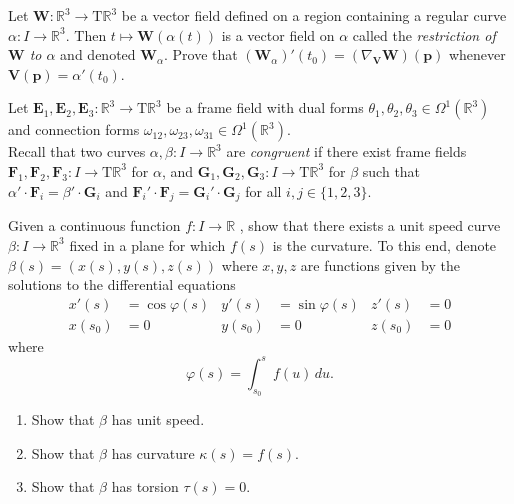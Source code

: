 \documentclass[12 pt, letterpaper]{hmcpset}
\begin{document}
\begin{problem}[Problem 1.]
	Let $\mathbf{W} : \mathbb{R}^{3} \to \mathrm{T}\mathbb{R}^{3}$ be a vector field defined on a region containing a regular curve $\alpha : I \to \mathbb{R}^{3}$. Then $t \mapsto \mathbf{W}(\alpha(t))$ is a vector field on $\alpha$ called the \textit{restriction of $\mathbf{W}$ to $\alpha$} and denoted $\mathbf{W}_{\alpha}$. Prove that $(\mathbf{W}_{\alpha})'(t_{0}) = (\nabla_{\mathbf{V}} \mathbf{W})(\mathbf{p})$ whenever $\mathbf{V}(\mathbf{p}) = \alpha'(t_{0})$.
\end{problem}

\pagebreak

\begin{problem}[Problem 2.]
	Let $\mathbf{E}_{1}, \mathbf{E}_{2}, \mathbf{E}_{3} : \mathbb{R}^{3} \to \mathrm{T} \mathbb{R}^{3}$ be a frame field with dual forms $\theta_{1}, \theta_2, \theta_{3} \in \Omega^{1}(\mathbb{R}^{3})$ and connection forms $\omega_{12}, \omega_{23}, \omega_{31} \in \Omega^{1}(\mathbb{R}^{3})$. \\

	Recall that two curves $\alpha, \beta : I \to \mathbb{R}^{3}$ are \textit{congruent} if there exist frame fields $\mathbf{F}_{1}, \mathbf{F}_{2}, \mathbf{F}_{3} : I \to \mathrm{T}\mathbb{R}^{3}$ for $\alpha$, and $\mathbf{G}_{1}, \mathbf{G}_{2}, \mathbf{G}_3 : I \to \mathrm{T} \mathbb{R}^{3}$ for $\beta$ such that $\alpha' \cdot \mathbf{F}_{i} = \beta' \cdot \mathbf{G}_{i}$ and $\mathbf{F}_{i}' \cdot \mathbf{F}_{j} = \mathbf{G}_{i}' \cdot \mathbf{G}_{j}$ for all $i, j \in \{ 1, 2, 3 \}$.
\end{problem}

\pagebreak

\begin{problem}[Problem 3.]
	Given a continuous function $f : I \to \mathbb{R}$ , show that there exists a unit speed curve $\beta : I \to \mathbb{R}^{3}$  fixed in a plane for which $f(s)$  is the curvature. To this end, denote $\beta(s) = (x(s), y(s), z(s))$  where $x, y, z$  are functions given by the solutions to the differential equations
	\begin{align*}
		x'(s) & = \cos{\varphi(s)} & y'(s) & = \sin{\varphi(s)} & z'(s) & = 0 \\
		x(s_{0}) & = 0 & y(s_{0}) & = 0 & z(s_{0}) & = 0
	\end{align*}
	where
	\[
		\varphi(s) = \int_{s_{0}}^{s} f(u) \, du.
	\]
	\begin{enumerate}
		\item Show that $\beta$ has unit speed.
		\item Show that $\beta$ has curvature $\kappa(s) = f(s)$.
		\item Show that $\beta$ has torsion $\tau(s) = 0$.
	\end{enumerate}
\end{problem}
\end{document}
